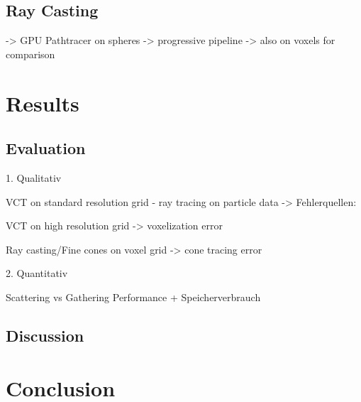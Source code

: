 \documentclass[hyperref,german,diplominf]{cgvpub}
\begin{document}
\section{Ray Casting}
-> GPU Pathtracer on spheres
-> progressive pipeline
-> also on voxels for comparison

\chapter{Results}
\section{Evaluation}

1. Qualitativ

VCT on standard resolution grid - ray tracing on particle data -> Fehlerquellen:

VCT on high resolution grid -> voxelization error

Ray casting/Fine cones on voxel grid -> cone tracing error

2. Quantitativ

Scattering vs Gathering Performance + Speicherverbrauch

\section{Discussion}
\chapter{Conclusion}
\end{document}
